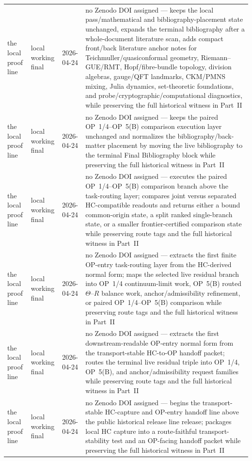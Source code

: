 \documentclass[12pt,a4paper]{article}
\DeclareRobustCommand{\QSCver}[1]{archival stage}
\renewcommand{\QSCver}[1]{historical release line}
\begin{document}
{\begin{longtable}{|P{0.14\textwidth}|P{0.17\textwidth}|P{0.15\textwidth}|P{0.42\textwidth}|}
the local proof line & local working final & 2026-04-24 & no Zenodo DOI assigned --- keeps the local pass/mathematical and bibliography-placement state unchanged, expands the terminal bibliography after a whole-document literature scan, adds compact front/back literature anchor notes for Teichmuller/quasiconformal geometry, Riemann--GUE/RMT, Hopf/fibre-bundle topology, division algebras, gauge/QFT landmarks, CKM/PMNS mixing, Julia dynamics, set-theoretic foundations, and probe/cryptographic/computational diagnostics, while preserving the full historical witness in Part~II \\
the local proof line & local working final & 2026-04-24 & no Zenodo DOI assigned --- keeps the paired OP~1/4--OP~5(B) comparison execution layer unchanged and normalizes the bibliography/back-matter placement by moving the live bibliography to the terminal Final Bibliography block while preserving the full historical witness in Part~II \\
\hline
the local proof line & local working final & 2026-04-24 & no Zenodo DOI assigned --- executes the paired OP~1/4--OP~5(B) comparison branch above the task-routing layer; compares joint versus separated HC-compatible readouts and returns either a bound common-origin state, a split ranked single-branch state, or a smaller frontier-certified comparison state while preserving route tags and the full historical witness in Part~II \\
\hline
the local proof line & local working final & 2026-04-24 & no Zenodo DOI assigned --- extracts the first finite OP-entry task-routing layer from the HC-derived normal form; maps the selected live residual branch into OP~1/4 continuum-limit work, OP~5(B) routed $\Theta$--$R$ balance work, anchor/admissibility refinement, or paired OP~1/4--OP~5(B) comparison while preserving route tags and the full historical witness in Part~II \\
\hline
the local proof line & local working final & 2026-04-24 & no Zenodo DOI assigned --- extracts the first downstream-readable OP-entry normal form from the transport-stable HC-to-OP handoff packet; routes the terminal live residual triple into OP~1/4, OP~5(B), and anchor/admissibility request families while preserving route tags and the full historical witness in Part~II \\
\hline
the local proof line & local working final & 2026-04-24 & no Zenodo DOI assigned --- begins the transport-stable HC-capture and OP-entry handoff line above the public \QSCver{legacy.33.0} release; packages local HC capture into a route-faithful transport-stability test and an OP-facing handoff packet while preserving the full historical witness in Part~II \\

\end{longtable}}
\end{document}
